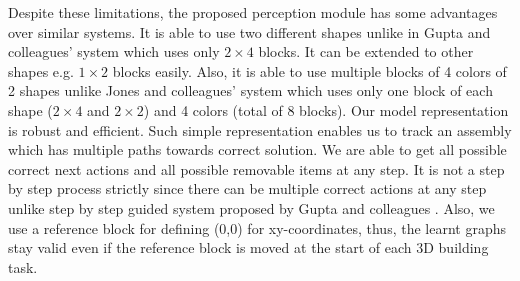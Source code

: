 Despite these limitations, the proposed perception module has some advantages over similar systems. It is able to use two different shapes unlike in Gupta and colleagues' system \parencite{gupta2012duplotrack} which uses only $2 \times 4$ blocks. It can be extended to other shapes e.g. $1 \times 2$ blocks easily. Also, it is able to use multiple blocks of 4 colors of 2 shapes unlike Jones and colleagues' system \parencite{jones2019toward}  which uses only one block of each shape ($2 \times 4$ and $2 \times 2$) and 4 colors (total of 8 blocks). Our model representation is robust and efficient. Such simple representation enables us to track an assembly which has multiple paths towards correct solution. We are able to get all possible correct next actions and all possible removable items at any step. It is not a step by step process strictly since there can be multiple correct actions at any step unlike step by step guided system proposed by Gupta and colleagues \parencite{gupta2012duplotrack}. Also, we use a reference block for defining (0,0) for xy-coordinates, thus, the learnt graphs stay valid even if the reference block is moved at the start of each 3D building task.  




